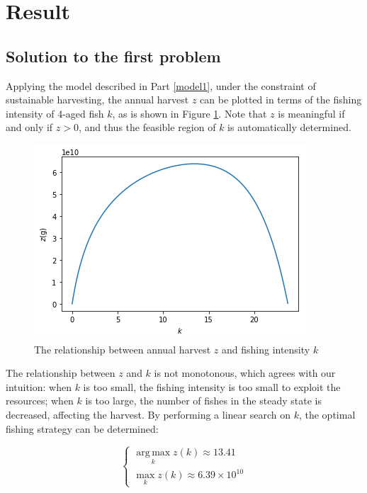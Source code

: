 \documentclass{IEEEtran}
\DeclareMathOperator*{\argmax}{arg\,max}
\begin{document}
\section{Result}

\subsection{Solution to the first problem}

Applying the model described in Part \ref{model1}, under the constraint of sustainable harvesting, the annual harvest $z$ can be plotted in terms of the fishing intensity of 4-aged fish $k$, as is shown in Figure \ref{plot1}. Note that $z$ is meaningful if and only if $z>0$, and thus the feasible region of $k$ is automatically determined.

\begin{figure}[h]
	\includegraphics[width=\columnwidth]{plot1}
	\caption{The relationship between annual harvest $z$ and fishing intensity $k$\label{plot1}}
\end{figure}

The relationship between $z$ and $k$ is not monotonous, which agrees with our intuition: when $k$ is too small, the fishing intensity is too small to exploit the resources; when $k$ is too large, the number of fishes in the steady state is decreased, affecting the harvest. By performing a linear search on $k$, the optimal fishing strategy can be determined:

$$\begin{cases}\argmax\limits_k z(k) \approx 13.41\\\max\limits_k z(k) \approx 6.39\times 10^{10} \end{cases}$$
\end{document}
